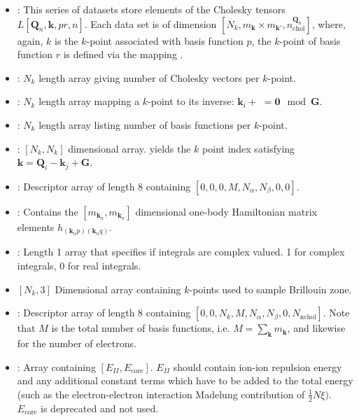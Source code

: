 \begin{itemize}
    \item {}: This series of datasets store elements of the Cholesky tensors $L[\mathbf{Q}_n,\mathbf{k},pr,n]$. Each data set is of dimension $[N_k,m_{\mathbf{k}}\times m_{\mathbf{k}'},n^{\mathbf{Q}_n}_\mathrm{chol}]$, where, again, $k$ is the $k$-point associated with basis function $p$, the $k$-point of basis function $r$ is defined via the mapping .
    \item {}: $N_k$ length array giving number of Cholesky vectors per $k$-point.
    \item {}: $N_k$ length array mapping a $k$-point to its inverse: $\mathbf{k}_i+$ $= \mathbf{0} \mod \mathbf{G}$.
    \item {}: $N_k$ length array listing number of basis functions per $k$-point.
    \item {}: $[N_k,N_k]$ dimensional array.  yields the $k$ point index satisfying $\mathbf{k}=\mathbf{Q}_i-\mathbf{k}_j+\mathbf{G}$.
    \item {}: Descriptor array of length 8 containing $[0,0,0,M,N_\alpha,N_\beta,0,0]$.
    \item {}: Contains the $[m_{\mathbf{k}_n},m_{\mathbf{k}_n}]$ dimensional one-body Hamiltonian matrix elements $h_{(\mathbf{k}_{n}p)(\mathbf{k}_{n}q)}$.
    \item {}: Length 1 array that specifies if integrals are complex valued. 1 for complex integrals, 0 for real integrals.
    \item {} $[N_k,3]$ Dimensional array containing $k$-points used to sample Brillouin zone.
    \item {}: Descriptor array of length 8 containing $[0,0,N_k,M,N_\alpha,N_\beta,0,N_\mathrm{nchol}]$. Note that $M$ is the total number of basis functions, i.e. $M=\sum_\mathbf{k} m_\mathbf{k}$, and likewise for the number of electrons.
    \item {}: Array containing $[E_{II}, E_{\mathrm{core}}]$. $E_{II}$ should contain ion-ion repulsion energy and any additional constant terms which have to be added to the total energy (such as the electron-electron interaction Madelung contribution of $\frac{1}{2} N \xi )$. $E_{\mathrm{core}}$ is deprecated and not used.
\end{itemize}


